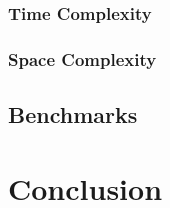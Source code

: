 \documentclass{article}
\begin{document}
                \subsubsection{Time Complexity}

                \subsubsection{Space Complexity}

            \subsection{Benchmarks}

    \section{Conclusion}




\end{document}
